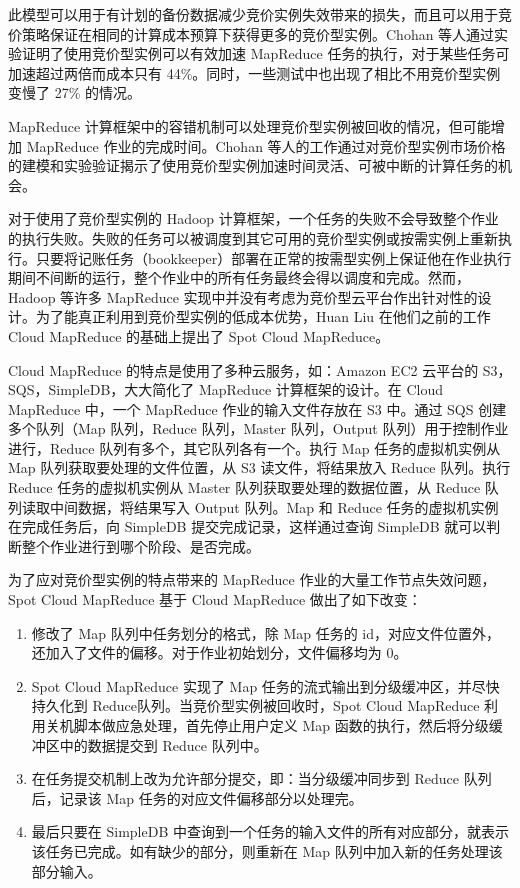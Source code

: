 此模型可以用于有计划的备份数据减少竞价实例失效带来的损失，而且可以用于竞价策略保证在相同的计算成本预算下获得更多的竞价型实例。Chohan 等人通过实验证明了使用竞价型实例可以有效加速 MapReduce 任务的执行，对于某些任务可加速超过两倍而成本只有 44\%。同时，一些测试中也出现了相比不用竞价型实例变慢了 27\% 的情况。

MapReduce 计算框架中的容错机制可以处理竞价型实例被回收的情况，但可能增加 MapReduce 作业的完成时间。Chohan 等人的工作通过对竞价型实例市场价格的建模和实验验证揭示了使用竞价型实例加速时间灵活、可被中断的计算任务的机会。

对于使用了竞价型实例的 Hadoop \cite{Hadoop} 计算框架，一个任务的失败不会导致整个作业的执行失败。失败的任务可以被调度到其它可用的竞价型实例或按需实例上重新执行。只要将记账任务（bookkeeper）部署在正常的按需型实例上保证他在作业执行期间不间断的运行，整个作业中的所有任务最终会得以调度和完成。然而，Hadoop 等许多 MapReduce 实现中并没有考虑为竞价型云平台作出针对性的设计。为了能真正利用到竞价型实例的低成本优势，Huan Liu \cite{Liu:2011:CMC:2170444.2170450} 在他们之前的工作 Cloud MapReduce \cite{Liu:2011:CMM:2007336.2007355} 的基础上提出了 Spot Cloud MapReduce。

Cloud MapReduce 的特点是使用了多种云服务，如：Amazon EC2 云平台的 S3，SQS，SimpleDB，大大简化了 MapReduce 计算框架的设计。在 Cloud MapReduce 中，一个 MapReduce 作业的输入文件存放在 S3 中。通过 SQS 创建多个队列（Map 队列，Reduce 队列，Master 队列，Output 队列）用于控制作业进行，Reduce 队列有多个，其它队列各有一个。执行 Map 任务的虚拟机实例从 Map 队列获取要处理的文件位置，从 S3 读文件，将结果放入 Reduce 队列。执行 Reduce 任务的虚拟机实例从 Master 队列获取要处理的数据位置，从 Reduce 队列读取中间数据，将结果写入 Output 队列。Map 和 Reduce 任务的虚拟机实例在完成任务后，向 SimpleDB 提交完成记录，这样通过查询 SimpleDB 就可以判断整个作业进行到哪个阶段、是否完成。

为了应对竞价型实例的特点带来的 MapReduce 作业的大量工作节点失效问题，Spot Cloud MapReduce 基于 Cloud MapReduce 做出了如下改变：
\begin{enumerate}
\item 修改了 Map 队列中任务划分的格式，除 Map 任务的 id，对应文件位置外，还加入了文件的偏移。对于作业初始划分，文件偏移均为 0。
\item Spot Cloud MapReduce 实现了 Map 任务的流式输出到分级缓冲区，并尽快持久化到 Reduce队列。当竞价型实例被回收时，Spot Cloud MapReduce 利用关机脚本做应急处理，首先停止用户定义 Map 函数的执行，然后将分级缓冲区中的数据提交到 Reduce 队列中。
\item 在任务提交机制上改为允许部分提交，即：当分级缓冲同步到 Reduce 队列后，记录该 Map 任务的对应文件偏移部分以处理完。
\item 最后只要在 SimpleDB 中查询到一个任务的输入文件的所有对应部分，就表示该任务已完成。如有缺少的部分，则重新在 Map 队列中加入新的任务处理该部分输入。
\end{enumerate}

